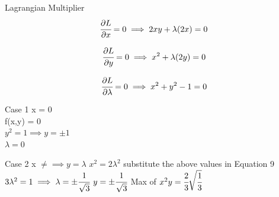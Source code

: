 \documentclass{beamer}
\begin{document}
\begin{frame}{Lagrangian Multiplier}
    \begin{equation}
        \cfrac{\partial L}{\partial x} = 0 \implies 2xy + \lambda(2x) = 0
    \end{equation}
    
    \begin{equation}
        \cfrac{\partial L}{\partial y} = 0 \implies x^{2} + \lambda(2y) = 0
    \end{equation}
    
    \begin{equation}
        \cfrac{\partial L}{\partial \lambda} = 0 \implies x^{2} + y^{2} - 1 = 0
    \end{equation}
\end{frame}

\begin{frame}{Case 1}
    x = 0\\
    \vspace{1em}
    f(x,y) = 0\\
    \vspace{1em}
    $y^{2} = 1 \implies y= \pm 1$\\
    \vspace{1em}
    $\lambda = 0$
\end{frame}

\begin{frame}{Case 2}
    x $\neq  \implies y = \lambda$
    \vspace{1em}
    $x^{2} = 2\lambda^{2}$ substitute the above values in Equation 9
    \vspace{1em}
    $3\lambda^{2} = 1 \implies \lambda = \pm \cfrac{1}{\sqrt{3}}$
    \vspace{1em}
    $y = \pm \cfrac{1}{\sqrt{3}}$
    \vspace{1em}
    Max of $x^{2}y = \cfrac{2}{3} \sqrt{\cfrac{1}{3}}$
\end{frame}

%
%    
\end{document}
